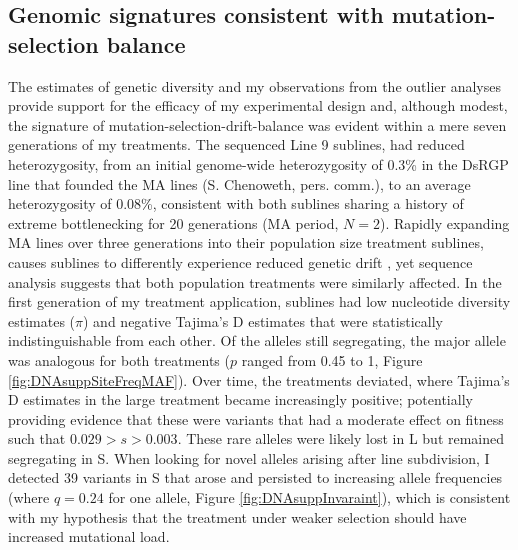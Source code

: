 \subsection{Genomic signatures consistent with mutation-selection balance}
The estimates of genetic diversity and my observations from the outlier analyses provide support for the efficacy of my experimental design and, although modest, the signature of mutation-selection-drift-balance was evident within a mere seven generations of my treatments. The sequenced Line 9 sublines, had reduced heterozygosity, from an initial genome-wide heterozygosity of 0.3\% in the DsRGP line that founded the MA lines (S. Chenoweth, pers. comm.), to an average heterozygosity of 0.08\%, consistent with both sublines sharing a history of extreme bottlenecking for 20 generations (MA period, $N=2$). Rapidly expanding MA lines over three generations into their population size treatment sublines, causes sublines to differently experience reduced genetic drift \citep{Kimu63}, yet sequence analysis suggests that both population treatments were similarly affected. In the first generation of my treatment application, sublines had low nucleotide diversity estimates ($\pi$) and negative Tajima’s D estimates that were statistically indistinguishable from each other. Of the alleles still segregating, the major allele was analogous for both treatments ($p$ ranged from 0.45 to 1, Figure \ref{fig:DNAsuppSiteFreqMAF}). Over time, the treatments deviated, where Tajima’s D estimates in the large treatment became increasingly positive; potentially providing evidence that these were variants that had a moderate effect on fitness such that $0.029 > s > 0.003$. These rare alleles were likely lost in L but remained segregating in S. When looking for novel alleles arising after line subdivision, I detected 39 variants in S that arose and persisted to increasing allele frequencies (where $q = 0.24$ for one allele, Figure \ref{fig:DNAsuppInvaraint}), which is consistent with my hypothesis that the treatment under weaker selection should have increased mutational load.\par

